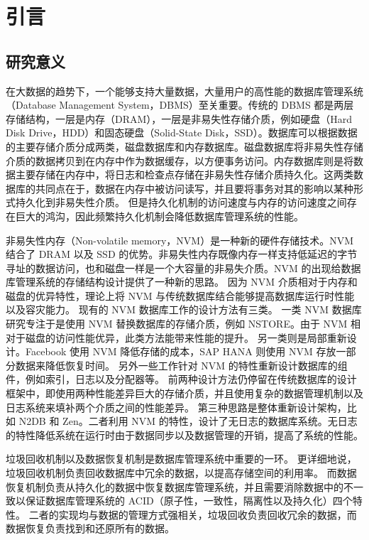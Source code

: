 
\chapter{引言}

\section{研究意义}

在大数据的趋势下，一个能够支持大量数据，大量用户的高性能的数据库管理系统（Database Management System，DBMS）至关重要。传统的 DBMS 都是两层存储结构，一层是内存（DRAM），一层是非易失性存储介质，例如硬盘（Hard Disk Drive，HDD）和固态硬盘（Solid-State Disk，SSD）。数据库可以根据数据的主要存储介质分成两类，磁盘数据库和内存数据库。磁盘数据库将非易失性存储介质的数据拷贝到在内存中作为数据缓存，以方便事务访问。内存数据库则是将数据主要存储在内存中，将日志和检查点存储在非易失性存储介质持久化。这两类数据库的共同点在于，数据在内存中被访问读写，并且要将事务对其的影响以某种形式持久化到非易失性介质。
但是持久化机制的访问速度与内存的访问速度之间存在巨大的鸿沟，因此频繁持久化机制会降低数据库管理系统的性能。

非易失性内存（Non-volatile memory，NVM）是一种新的硬件存储技术。NVM 结合了 DRAM 以及 SSD 的优势。非易失性内存既像内存一样支持低延迟的字节寻址的数据访问，也和磁盘一样是一个大容量的非易失介质。NVM 的出现给数据库管理系统的存储结构设计提供了一种新的思路。
因为 NVM 介质相对于内存和磁盘的优异特性，理论上将 NVM 与传统数据库结合能够提高数据库运行时性能以及容灾能力。
现有的 NVM 数据库工作的设计方法有三类。
一类 NVM 数据库研究专注于是使用 NVM 替换数据库的存储介质，例如 NSTORE\cite{arulraj_lets_2015}。由于 NVM 相对于磁盘的访问性能优异，此类方法能带来性能的提升。
另一类则是局部重新设计。Facebook 使用 NVM 降低存储的成本\cite{facebook}，SAP HANA 则使用 NVM 存放一部分数据来降低恢复时间\cite{andrei_sap_2017}。
另外一些工作针对 NVM 的特性重新设计数据库的组件，例如索引\cite{nv-tree,chen_persistent_2015,ma_roart_2021,arulraj2018bztree}，日志\cite{wbl}以及分配器\cite{pmdk,bhandari_makalu_2016}等。
前两种设计方法仍停留在传统数据库的设计框架中，即使用两种性能差异巨大的存储介质，并且使用复杂的数据管理机制以及日志系统来填补两个介质之间的性能差异。
第三种思路是整体重新设计架构，比如 N2DB\cite{liu_graduate} 和 Zen\cite{liu_zen_2021}。二者利用 NVM 的特性，设计了无日志的数据库系统。无日志的特性降低系统在运行时由于数据同步以及数据管理的开销，提高了系统的性能。


垃圾回收机制以及数据恢复机制是数据库管理系统中重要的一环。
更详细地说，垃圾回收机制负责回收数据库中冗余的数据，以提高存储空间的利用率。
而数据恢复机制负责从持久化的数据中恢复数据库管理系统，并且需要消除数据中的不一致以保证数据库管理系统的 ACID（原子性，一致性，隔离性以及持久化）四个特性。
二者的实现均与数据的管理方式强相关，垃圾回收负责回收冗余的数据，而数据恢复负责找到和还原所有的数据。

